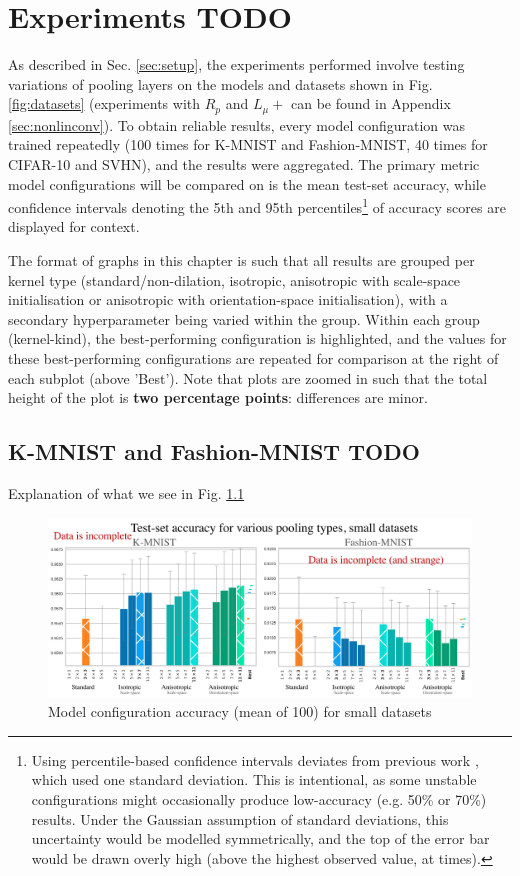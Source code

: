 \documentclass[a4paper, 12pt]{report}
\def\comment#1{\color{red}#1\color{black}}
\begin{document}
\chapter{Experiments \comment{TODO}}

As described in Sec. \ref{sec:setup}, the experiments performed involve testing variations of pooling layers on the models and datasets shown in Fig. \ref{fig:datasets} (experiments with $R_p$ and $L_\mu+$ can be found in Appendix \ref{sec:nonlinconv}).
To obtain reliable results, every model configuration was trained repeatedly (100 times for K-MNIST and Fashion-MNIST, 40 times for CIFAR-10 and SVHN), and the results were aggregated. The primary metric model configurations will be compared on is the mean test-set accuracy, while confidence intervals denoting the 5th and 95th percentiles\footnote{Using percentile-based confidence intervals deviates from previous work \cite{thierrybsc, koenbsc}, which used one standard deviation. This is intentional, as some unstable configurations might occasionally produce low-accuracy (e.g. 50\% or 70\%) results. Under the Gaussian assumption of standard deviations, this uncertainty would be modelled symmetrically, and the top of the error bar would be drawn overly high (above the highest observed value, at times).} of accuracy scores are displayed for context.

The format of graphs in this chapter is such that all results are grouped per kernel type (standard/non-dilation, isotropic, anisotropic with scale-space initialisation or anisotropic with orientation-space initialisation), with a secondary hyperparameter being varied within the group. Within each group (kernel-kind), the best-performing configuration is highlighted, and the values for these best-performing configurations are repeated for comparison at the right of each subplot (above 'Best'). Note that plots are zoomed in such that the total height of the plot is \textbf{two percentage points}: differences are minor.

\section{K-MNIST and Fashion-MNIST  \comment{TODO}}
\comment{Explanation of what we see in Fig. \ref{fig:res-small}}

\newpage
\begin{figure}[ht!]
	\center
  \includegraphics[width=1\textwidth]{figures/results-small.png}
  \caption{Model configuration accuracy (mean of 100) for small datasets}
  \label{fig:res-small}
\end{figure}
\end{document}
